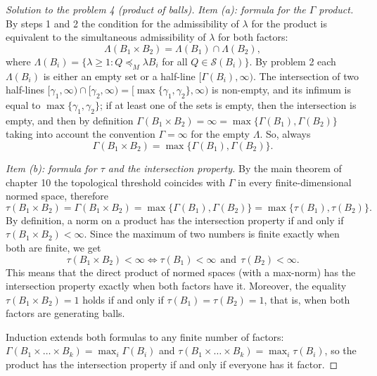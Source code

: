 \documentclass[a4paper,12pt]{report}
\begin{document}
\begin{proof}[Solution to the problem \textup{4} \textup{(}product of balls\textup{)}]
\textit{Item \textup{(a)}\textup{:} formula for the $\Gamma$ product.} By steps \textup{1} and \textup{2} the condition for the admissibility of $\lambda$ for the product is equivalent to the simultaneous admissibility of $\lambda$ for both factors\textup{:}
\[
\Lambda(B_1\times B_2)=\Lambda(B_1)\cap\Lambda(B_2),
\]
where $\Lambda(B_i)=\{\lambda\ge1: Q\preceq_M\lambda B_i$ for all $Q\in\mathcal S(B_i)\}$. By problem \textup{2} each $\Lambda(B_i)$ is either an empty set or a half-line $[\Gamma(B_i),\infty)$. The intersection of two half-lines $[\gamma_1,\infty)\cap[\gamma_2,\infty)=[\max\{\gamma_1,\gamma_2\},\infty)$ is non-empty, and its infimum is equal to $\max\{\gamma_1,\gamma_2\}$\textup{;} if at least one of the sets is empty, then the intersection is empty, and then by definition $\Gamma(B_1\times B_2)=\infty=\max\{\Gamma(B_1),\Gamma(B_2)\}$ taking into account the convention $\Gamma=\infty$ for the empty $\Lambda$. So, always
\[
\Gamma(B_1\times B_2)=\max\{\Gamma(B_1),\Gamma(B_2)\}.
\]

\textit{Item \textup{(b)}\textup{:} formula for $\tau$ and the intersection property.} By the main theorem of chapter \textup{10} the topological threshold coincides with $\Gamma$ in every finite-dimensional normed space, therefore
\[
\tau(B_1\times B_2)=\Gamma(B_1\times B_2)=\max\{\Gamma(B_1),\Gamma(B_2)\}=\max\{\tau(B_1),\tau(B_2)\}.
\]
By definition, a norm on a product has the intersection property if and only if $\tau(B_1\times B_2)<\infty$. Since the maximum of two numbers is finite exactly when both are finite, we get
\[
\tau(B_1\times B_2)<\infty\iff \tau(B_1)<\infty\ \ \text{and}\ \ \tau(B_2)<\infty .
\]
This means that the direct product of normed spaces \textup{(}with a max-norm\textup{)} has the intersection property exactly when both factors have it. Moreover, the equality $\tau(B_1\times B_2)=1$ holds if and only if $\tau(B_1)=\tau(B_2)=1$, that is, when both factors are generating balls.

Induction extends both formulas to any finite number of factors\textup{:} $\Gamma(B_1\times\dots\times B_k)=\max_i\Gamma(B_i)$ and $\tau(B_1\times\dots\times B_k)=\max_i\tau(B_i)$, so the product has the intersection property if and only if everyone has it factor.

\end{proof}
\end{document}
